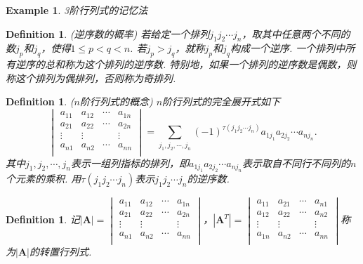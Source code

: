 \documentclass{article}
\newtheorem{example}[theorem]{Example}
\newtheorem{definition}[theorem]{Definition}
\newcommand{\mbf}[1]{\bm{#1}}
\begin{document}
\begin{example}
\rm 3阶行列式的记忆法
\end{example}

\begin{definition}
\rm {\color{red} (逆序数的概率)} 若给定一个排列$j_1j_2\cdots j_n$，取其中任意两个不同的数$j_p$和$j_q$，使得$1 \leq p< q <n$. 若$j_p > j_q$，就称$j_p$和$j_q$构成一个{\color{red}逆序}. 一个排列中所有逆序的总和称为这个排列的{\color{red}逆序数}. 特别地，如果一个排列的逆序数是偶数，则称这个排列为{\color{red}偶排列}，否则称为{\color{red}奇排列}.
\end{definition}

\begin{definition}
\rm {\color{red} ($n$阶行列式的概念)} $n$阶行列式的{\color{red}完全展开式}如下
$$
\begin{vmatrix}
a_{11} & a_{12} & \cdots & a_{1n} \\
a_{21} & a_{22} & \cdots & a_{2n} \\
\vdots & \vdots & 		 & \vdots \\
a_{n1} & a_{n2} & \cdots & a_{nn} \\
\end{vmatrix}
=\sum\limits_{j_1,j_2,\cdots,j_n} (-1)^{\tau(j_1j_2\cdots j_n)} a_{1j_1}a_{2j_2}\cdots a_{nj_n}.
$$
其中$j_1,j_2,\cdots,j_n$表示一组列指标的排列，即$a_{1j_1}a_{2j_2}\cdots a_{nj_n}$表示取自不同行不同列的$n$个元素的乘积. 用$\tau(j_1j_2\cdots j_n)$表示$j_1j_2\cdots j_n$的逆序数.  
\end{definition}

\begin{definition}
\rm 记$|\mathbf{A}| = \begin{vmatrix}
a_{11} & a_{12} & \cdots & a_{1n} \\
a_{21} & a_{22} & \cdots & a_{2n} \\
\vdots & \vdots & 		 & \vdots \\
a_{n1} & a_{n2} & \cdots & a_{nn} \\
\end{vmatrix}$，$|\mathbf{A}^T| = \begin{vmatrix}
a_{11} & a_{21} & \cdots & a_{n1} \\
a_{12} & a_{22} & \cdots & a_{n2} \\
\vdots & \vdots & 		 & \vdots \\
a_{1n} & a_{n2} & \cdots & a_{nn} \\
\end{vmatrix}$称为$|\mbf{A}|$的{\color{red}转置行列式}.
\end{definition}
\end{document}
